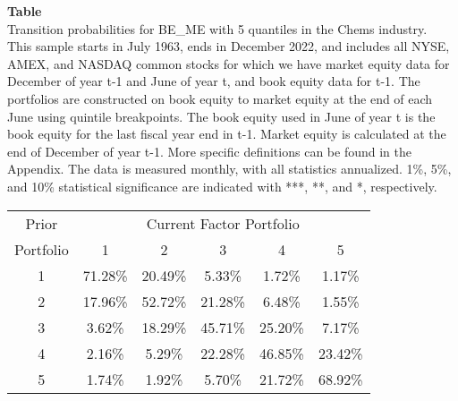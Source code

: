 \begin{table*}[ht!]
\raggedright
{}
\label{tab: transition_probs_BE_ME_Chems_with_5_quantiles}
\textbf{Table \thetable} \\
Transition probabilities for BE_ME with 5 quantiles in the Chems industry. \\
\hspace*{1em}This sample starts in July 1963, ends in December 2022, and includes all NYSE, AMEX, and NASDAQ common stocks for which we have market equity data for December of year t-1 and June of year t, and book equity data for t-1. The portfolios are constructed on book equity to market equity at the end of each June using quintile breakpoints.  The book equity used in June of year t is the book equity for the last fiscal year end in t-1.  Market equity is calculated at the end of December of year t-1.  More specific definitions can be found in the Appendix.  The data is measured monthly, with all statistics annualized.  1\%, 5\%, and 10\% statistical significance are indicated with ***, **, and *, respectively. \\
\vspace{0.5em}
\centering
\begin{adjustbox}{max width=\textwidth}
\begin{tabular}{@{}cccccc@{}}
\toprule
Prior & \multicolumn{5}{c}{Current Factor Portfolio} \\
Portfolio & 1 & 2 & 3 & 4 & 5 \\
\midrule
1 & 71.28\% & 20.49\% & 5.33\% & 1.72\% & 1.17\% \\
2 & 17.96\% & 52.72\% & 21.28\% & 6.48\% & 1.55\% \\
3 & 3.62\% & 18.29\% & 45.71\% & 25.20\% & 7.17\% \\
4 & 2.16\% & 5.29\% & 22.28\% & 46.85\% & 23.42\% \\
5 & 1.74\% & 1.92\% & 5.70\% & 21.72\% & 68.92\% \\
\bottomrule
\end{tabular}
\end{adjustbox}
\end{table*}